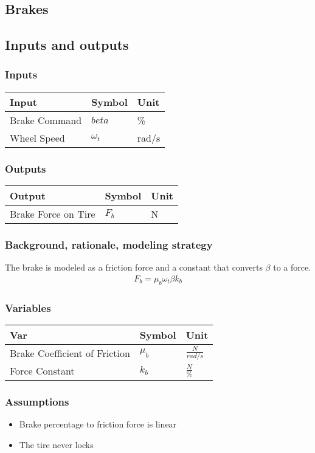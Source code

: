 \documentclass[../SimBALink.tex]{subfiles}
\begin{document}
\subsection{Brakes}

\subsection{Inputs and outputs}
	\subsubsection{Inputs}
	\begin{tabular}{ l | l | l  }
		Input					&	Symbol		&	Unit		\\	\hline
		Brake Command			& 	$beta$ 		&	\% \\
		Wheel Speed				&	$\omega_t$	&	rad/s
	\end{tabular}
	
	\subsubsection{Outputs}
	\begin{tabular}{ l | l | l  }
		Output					&	Symbol		&	Unit		\\	\hline
		Brake Force on Tire		&	$F_b$		&	N
	\end{tabular}

\subsubsection{Background, rationale, modeling strategy}
The brake is modeled as a friction force and a constant that converts $\beta$ to a force.
		\begin{gather}
			F_b = \mu_b \omega_t \beta k_b
		\end{gather}


\subsubsection{Variables}
	\begin{tabular}{ l | l | l  }
		Var									&	Symbol		&	Unit		\\	\hline
		Brake Coefficient of Friction		&	$\mu_b$		&	 $\frac{N}{rad/s}$ \\
		Force Constant						&	$k_b$		&	 $\frac{N}{\%}$
	\end{tabular}

\subsubsection{Assumptions}
\begin{itemize}
  \item Brake percentage to friction force is linear
  \item The tire never locks
\end{itemize}
\end{document}
